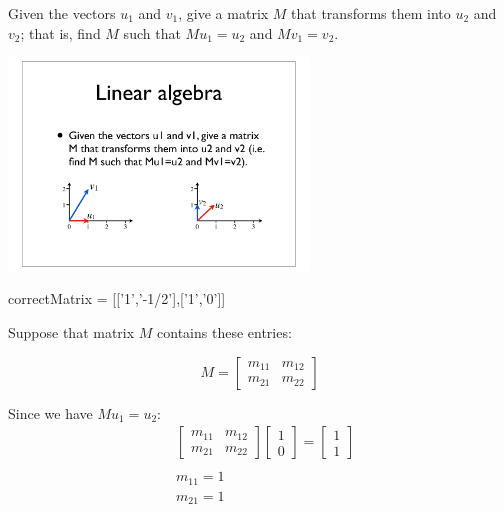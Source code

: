 \documentclass{ximera}
\begin{document}
\begin{question}
Given the vectors $u_1$ and $v_1$, give a matrix $M$ that transforms them
into $u_2$ and $v_2$; that is, find $M$ such that $M u_1=u_2$ and $M v_1=v_2$.

\begin{image}
\includegraphics[width=0.6\textwidth]{fig.pdf}
\end{image}

\begin{solution}
\begin{matrix-answer}[name=M]
    correctMatrix = [['1','-1/2'],['1','0']]
\end{matrix-answer}
\end{solution}

Suppose that matrix $M$ contains these entries:
\begin{center}
\begin{equation*}
M =
\begin{bmatrix}
m_{11} & m_{12} \\
m_{21} & m_{22}
\end{bmatrix}
\end{equation*}
\end{center}

Since we have $M u_1 = u_2$:
\begin{align*}
&\begin{bmatrix}
m_{11} & m_{12} \\
m_{21} & m_{22}
\end{bmatrix}
\begin{bmatrix}
1 \\
0
\end{bmatrix}
= 
\begin{bmatrix}
1 \\
1
\end{bmatrix} \\
\\
& m_{11} = 1 \\
& m_{21} = 1
\end{align*}


\end{question}
\end{document}
